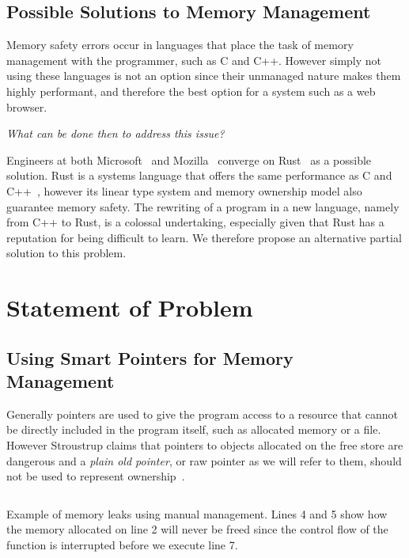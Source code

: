 \documentclass{proposal}
\begin{document}
    \subsection{Possible Solutions to Memory Management}\label{subsec:possible-solutions-to-memory-management}

    Memory safety errors occur in languages that place the task of memory management with the programmer, such as C and C++.
    However simply not using these languages is not an option since their unmanaged nature makes them highly performant, and therefore the best option for a system such as a web browser.

    \emph{What can be done then to address this issue?}

    Engineers at both Microsoft~\cite{Thomas2019} and Mozilla~\cite{Hostfelt2019} converge on Rust~\cite{Balasubramanian2017} as a possible solution.
    Rust is a systems language that offers the same performance as C and C++~\cite{Lin2016}, however its linear type system and memory ownership model also guarantee memory safety.
    The rewriting of a program in a new language, namely from C++ to Rust, is a colossal undertaking, especially given that Rust has a reputation for being difficult to learn.
    We therefore propose an alternative partial solution to this problem.




    \section{Statement of Problem}\label{sec:statement-of-problem}

    \subsection{Using Smart Pointers for Memory Management}\label{subsec:using-smart-pointers-for-memory-management}

    Generally pointers are used to give the program access to a resource that cannot be directly included in the program itself, such as allocated memory or a file.
    However Stroustrup claims that pointers to objects allocated on the free store are dangerous and a \emph{plain old pointer}, or raw pointer as we will refer to them, should not be used to represent ownership~\cite{Stroustrup2018}.

    \begin{listing}
        \inputminted{c++}{code/manual-leak.cpp}
        \caption{Example of memory leaks using manual management. Lines 4 and 5 show how the memory allocated on line 2 will never be freed since the control flow of the function is interrupted before we execute line 7.}
        \label{lst:manual-leak}
    \end{listing}
\end{document}
